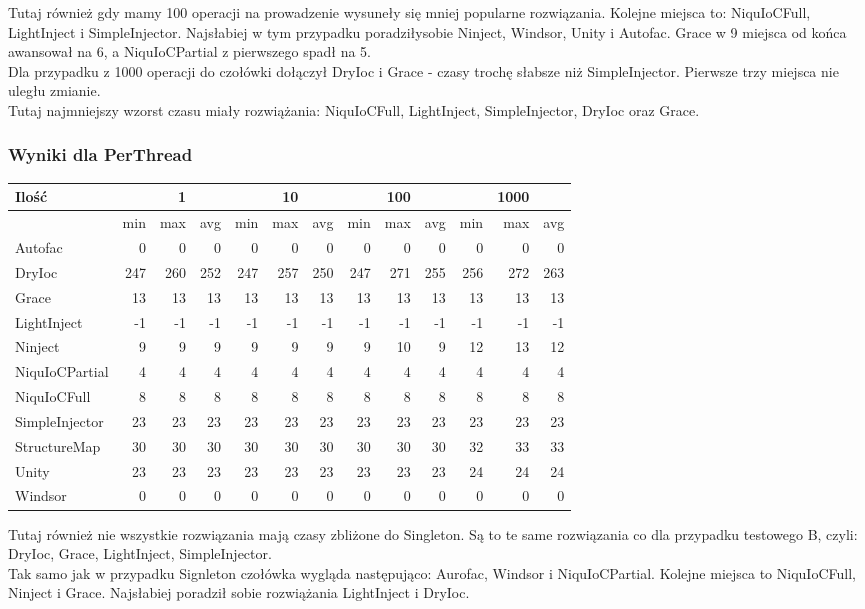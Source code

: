 \documentclass[12pt]{article}
\begin{document}
Tutaj również gdy mamy 100 operacji na prowadzenie wysuneły się mniej popularne rozwiązania. Kolejne miejsca to: NiquIoCFull, LightInject i SimpleInjector. Najsłabiej w tym przypadku poradziłysobie Ninject, Windsor, Unity i Autofac. Grace w 9 miejsca od końca awansował na 6, a NiquIoCPartial z pierwszego spadł na 5.\\
Dla przypadku z 1000 operacji do czołówki dołączył DryIoc i Grace - czasy trochę słabsze niż SimpleInjector. Pierwsze trzy miejsca nie uległu zmianie.\\
Tutaj najmniejszy wzorst czasu miały rozwiążania: NiquIoCFull, LightInject, SimpleInjector, DryIoc oraz Grace.

\clearpage
\subsubsection{Wyniki dla PerThread}
\begin{center}
\begin{small}
	\begin{tabular}{ | l | r r r | r r r | r r r | r r r | }
    		\hline
     		Ilość & & 1 & & & 10 & & & 100 & & & 1000 & \\ \hline
     		 & min & max & avg & min & max & avg & min & max & avg & min & max & avg \\ \hline
    		Autofac & 0 & 0 & 0 & 0 & 0 & 0 & 0 & 0 & 0 & 0 & 0 & 0 \\ \hline
   		DryIoc & 247 & 260 & 252 & 247 & 257 & 250 & 247 & 271 & 255 & 256 & 272 & 263 \\ \hline
		Grace & 13 & 13 & 13 & 13 & 13 & 13 & 13 & 13 & 13 & 13 & 13 & 13 \\ \hline
		LightInject & -1 & -1 & -1 & -1 & -1 & -1 & -1 & -1 & -1 & -1 & -1 & -1 \\ \hline
		Ninject & 9 & 9 & 9 & 9 & 9 & 9 & 9 & 10 & 9 & 12 & 13 & 12 \\ \hline
		NiquIoCPartial & 4 & 4 & 4 & 4 & 4 & 4 & 4 & 4 & 4 & 4 & 4 & 4 \\ \hline
		NiquIoCFull & 8 & 8 & 8 & 8 & 8 & 8 & 8 & 8 & 8 & 8 & 8 & 8 \\ \hline
		SimpleInjector & 23 & 23 & 23 & 23 & 23 & 23 & 23 & 23 & 23 & 23 & 23 & 23 \\ \hline
		StructureMap & 30 & 30 & 30 & 30 & 30 & 30 & 30 & 30 & 30 & 32 & 33 & 33 \\ \hline
		Unity & 23 & 23 & 23 & 23 & 23 & 23 & 23 & 23 & 23 & 24 & 24 & 24 \\ \hline
		Windsor & 0 & 0 & 0 & 0 & 0 & 0 & 0 & 0 & 0 & 0 & 0 & 0 \\
    		\hline
  	\end{tabular}
\end{small}
\end{center}
Tutaj również nie wszystkie rozwiązania mają czasy zbliżone do Singleton. Są to te same rozwiązania co dla przypadku testowego B, czyli: DryIoc, Grace, LightInject, SimpleInjector.\\
Tak samo jak w przypadku Signleton czołówka wygląda następująco: Aurofac, Windsor i NiquIoCPartial. Kolejne miejsca to NiquIoCFull, Ninject i Grace. Najsłabiej poradził sobie rozwiążania LightInject i DryIoc.
\end{document}

